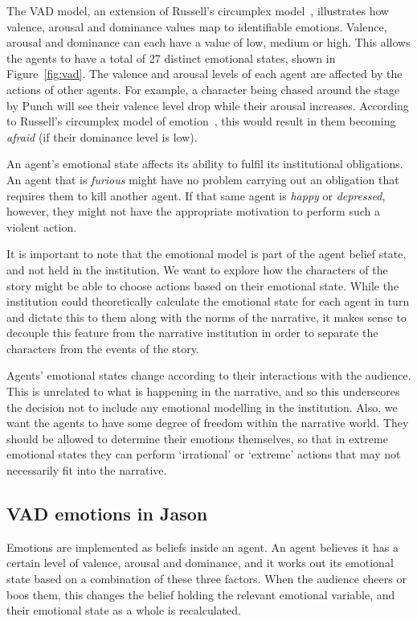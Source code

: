 \documentclass[11pt]{report}
\def\jnote#1{\todo[color=CornflowerBlue,size=\scriptsize]{Julian: #1}}
\begin{document}
The VAD model, an extension of Russell's circumplex
model~\citep{russell1980circumplex}, illustrates how valence, arousal and
dominance values map to identifiable emotions. Valence, arousal and dominance
can each have a value of low, medium or high. This allows the agents to have a
total of 27 distinct emotional states, shown in Figure~\ref{fig:vad}.
The valence and arousal levels of each agent are affected by the actions of other agents. For example, a character being chased around the stage by Punch will see their valence level drop while their arousal increases. According to Russell's circumplex model of emotion~\citep{russell1980circumplex}, this would result in them becoming \emph{afraid\/} (if their dominance level is low).

An agent's emotional state affects its ability to fulfil its institutional obligations. An agent that is \emph{furious\/} might have no problem carrying out an obligation that requires them to kill another agent. If that same agent is \emph{happy\/} or \emph{depressed}, however, they might not have the appropriate motivation to perform such a violent action.

It is important to note that the emotional model is part of the agent belief state, and not held in the institution. We want to explore how the characters of the story might be able to choose actions based on their emotional state. While the institution could theoretically calculate the emotional state for each agent in turn and dictate this to them along with the norms of the narrative, it makes sense to decouple this feature from the narrative institution in order to separate the characters from the events of the story. %

Agents' emotional states change according to their interactions with the audience. This is unrelated to what is happening in the narrative, and so this underscores the decision not to include any emotional modelling in the institution. Also, we want the agents to have some degree of freedom within the narrative world. They should be allowed to determine their emotions themselves, so that in extreme emotional states they can perform `irrational' or `extreme' actions that may not necessarily fit into the narrative.

\subsection{VAD emotions in Jason}
Emotions are implemented as beliefs inside an agent. An agent believes it has a certain level of valence, arousal and dominance, and it works out its emotional state based on a combination of these three factors. When the audience cheers or boos them, this changes the belief holding the relevant emotional variable, and their emotional state as a whole is recalculated.
\end{document}
